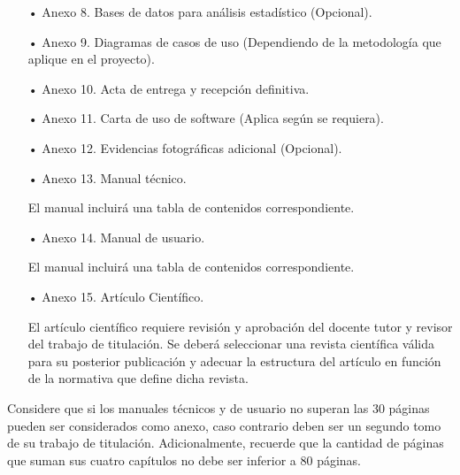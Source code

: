 \documentclass[12pt, a4paper, nofontenc, numbers=endperiod]{apa7}
\begin{document}
{\begin{itemize}[leftmargin=1.70cm]
	\item[•] 	Anexo 8. Bases de datos para análisis estadístico (Opcional).
	
	\item[•] 	Anexo 9. Diagramas de casos de uso (Dependiendo de la metodología que aplique en el proyecto).
	
	\item[•] 	Anexo 10. Acta de entrega y recepción definitiva.
	
	\item[•] 	Anexo 11. Carta de uso de software (Aplica según se requiera).
	
	\item[•]	Anexo 12. Evidencias fotográficas adicional (Opcional).
	
	\item[•] 	Anexo 13. Manual técnico.
	
	\setlength{\parindent}{1.27cm} El manual incluirá una tabla de contenidos correspondiente.
	
	\item[•] 	Anexo 14. Manual de usuario.
	
	\setlength{\parindent}{1.27cm} El manual incluirá una tabla de contenidos correspondiente.
	
	\item[•] 	Anexo 15. Artículo Científico.
	
	\setlength{\parindent}{1.27cm}El artículo científico requiere revisión y aprobación del docente tutor y revisor del trabajo de titulación. Se deberá seleccionar una revista científica válida para su posterior publicación y adecuar la estructura del artículo en función de la normativa que define dicha revista.
	
	
	
\end{itemize}

\setlength{\parindent}{1.27cm}Considere que si los manuales técnicos y de usuario no superan las 30 páginas pueden ser considerados como anexo, caso contrario deben ser un segundo tomo de su trabajo de titulación. Adicionalmente, recuerde que la cantidad de páginas que suman sus cuatro capítulos no debe ser inferior a 80 páginas.

\newpage
}
\end{document}

